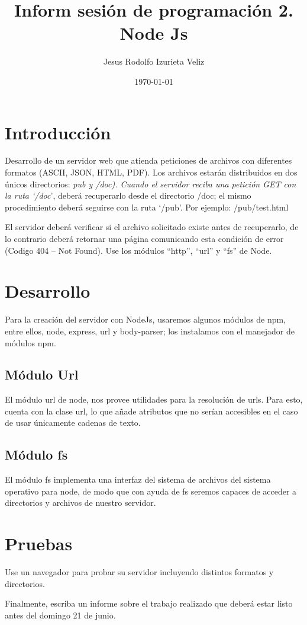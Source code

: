 \documentclass[11pt]{article}
\author{Jesus Rodolfo Izurieta Veliz}
\date{\today}
\title{Inform sesión de programación 2. Node Js}
\begin{document}
\maketitle
\tableofcontents


\section{Introducción}
\label{sec:org22ee969}
Desarrollo de un servidor web que atienda peticiones de archivos con diferentes formatos (ASCII, JSON, HTML, PDF).
Los archivos estarán distribuidos en dos únicos directorios: \emph{pub y /doc).
Cuando el servidor reciba una petición GET con la ruta ‘/doc}', deberá recuperarlo desde el directorio /doc;
el mismo procedimiento deberá seguirse con la ruta ‘/pub'. Por ejemplo: /pub/test.html

El servidor deberá verificar si el archivo solicitado existe antes de recuperarlo,
de lo contrario deberá retornar una página comunicando esta condición de error (Codigo 404 – Not Found).
Use los módulos “http”, “url” y “fs” de Node.

\section{Desarrollo}
\label{sec:orgc9d682c}
Para la creación del servidor con NodeJs, usaremos algunos módulos de npm,
entre ellos, node, express, url y body-parser; los instalamos con el manejador de módulos npm.

\subsection{Módulo Url}
\label{sec:org89a6d9f}
El módulo url de node, nos provee utilidades para la resolución de urls.
Para esto, cuenta con la clase url, lo que añade atributos que no serían accesibles en el caso de usar únicamente cadenas de texto.

\subsection{Módulo fs}
\label{sec:orgd053c5b}
El módulo fs implementa una interfaz del sistema de archivos del sistema operativo para node,
de modo que con ayuda de fs seremos capaces de acceder a directorios y archivos de nuestro servidor.

\section{Pruebas}
\label{sec:org223f616}
Use un navegador para probar su servidor incluyendo distintos formatos y directorios.

Finalmente, escriba un informe sobre el trabajo realizado que deberá estar listo antes del domingo 21 de junio.
\end{document}

